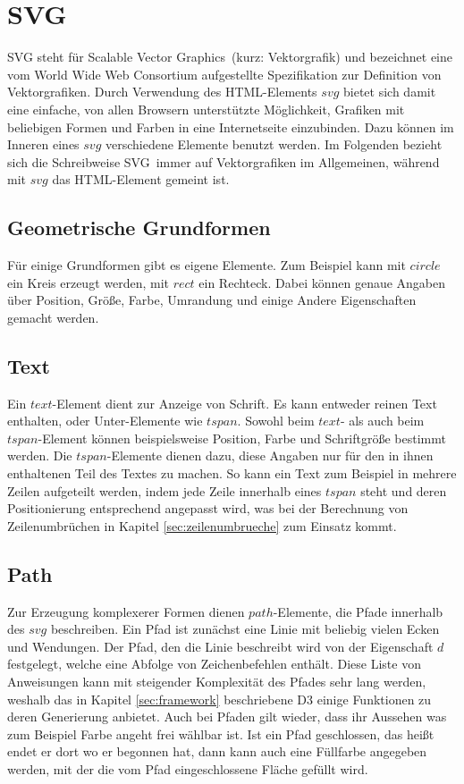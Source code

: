 \section{SVG}\label{sec:svg}
SVG steht für \glqq Scalable Vector Graphics\grqq\ (kurz: Vektorgrafik) und bezeichnet eine vom World Wide Web Consortium aufgestellte Spezifikation zur Definition von Vektorgrafiken.  Durch Verwendung des HTML-Elements $svg$ bietet sich damit eine einfache, von allen Browsern unterstützte Möglichkeit, Grafiken mit beliebigen Formen und Farben in eine Internetseite einzubinden. Dazu können im Inneren eines $svg$ verschiedene Elemente benutzt werden. Im Folgenden bezieht sich die Schreibweise \glqq SVG\grqq\ immer auf Vektorgrafiken im Allgemeinen, während mit $svg$ das HTML-Element gemeint ist.

\subsection{Geometrische Grundformen}
Für einige Grundformen gibt es eigene Elemente. Zum Beispiel kann mit $circle$ ein Kreis erzeugt werden, mit $rect$ ein Rechteck. Dabei können genaue Angaben über Position, Größe, Farbe, Umrandung und einige Andere Eigenschaften gemacht werden.

\subsection{Text}
Ein $text$-Element dient zur Anzeige von Schrift. Es kann entweder reinen Text enthalten, oder Unter-Elemente wie $tspan$. Sowohl beim $text$- als auch beim $tspan$-Element können beispielsweise Position, Farbe und Schriftgröße bestimmt werden. Die $tspan$-Elemente dienen dazu, diese Angaben nur für den in ihnen enthaltenen Teil des Textes zu machen. So kann ein Text zum Beispiel in mehrere Zeilen aufgeteilt werden, indem jede Zeile innerhalb eines $tspan$ steht und deren Positionierung entsprechend angepasst wird, was bei der Berechnung von Zeilenumbrüchen in Kapitel \ref{sec:zeilenumbrueche} zum Einsatz kommt.

\subsection{Path}
Zur Erzeugung komplexerer Formen dienen $path$-Elemente, die Pfade innerhalb des $svg$ beschreiben. Ein Pfad ist zunächst eine Linie mit beliebig vielen Ecken und Wendungen. Der Pfad, den die Linie beschreibt wird von der Eigenschaft $d$ festgelegt, welche eine Abfolge von Zeichenbefehlen enthält. Diese Liste von Anweisungen kann mit steigender Komplexität des Pfades sehr lang werden, weshalb das in Kapitel \ref{sec:framework} beschriebene D3 einige Funktionen zu deren Generierung anbietet. Auch bei Pfaden gilt wieder, dass ihr Aussehen was zum Beispiel Farbe angeht frei wählbar ist. Ist ein Pfad geschlossen, das heißt endet er dort wo er begonnen hat, dann kann auch eine Füllfarbe angegeben werden, mit der die vom Pfad eingeschlossene Fläche gefüllt wird.

